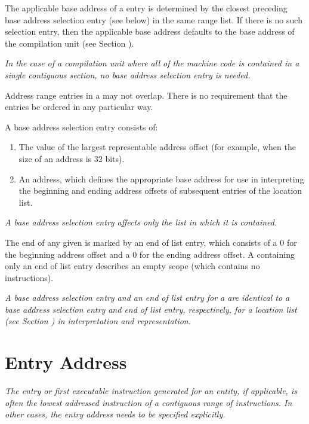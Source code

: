 The applicable base address of a  entry
is determined
by the closest preceding base address selection entry (see
below) in the same range list. If there is no such selection
entry, then the applicable base address defaults to the base
address of the compilation unit 
(see Section ).

\textit{In the case of a compilation unit where all of the machine
code is contained in a single contiguous section, no base
address selection entry is needed.}

Address range entries in
a  may not overlap.
There is no requirement that
the entries be ordered in any particular way.

A base address selection entry consists of:
\begin{enumerate}[1. ]
\item The value of the largest representable address offset (for example, \wffffffff when the size of
an address is 32 bits).

\item An address, which defines the appropriate base address for use in interpreting the beginning
and ending address offsets of subsequent entries of the location list.
\end{enumerate}
\textit{A base address selection entry 
affects only the list in which it is contained.}


The end of any given  is marked by an 
end of list entry, 
which consists of a 0 for the beginning address
offset and a 0 for the ending address offset. 
A 
containing only an end of list entry describes an empty scope
(which contains no instructions).

\textit{A base address selection entry and an 
end of list entry for
a  
are identical to a base address selection entry
and end of list entry, respectively, for a location list
(see Section ) 
in interpretation and representation.}



\section{Entry Address}
\label{chap:entryaddress}
\textit{The entry or first executable instruction generated
for an entity, if applicable, is often the lowest addressed
instruction of a contiguous range of instructions. In other
cases, the entry address needs to be specified explicitly.}

